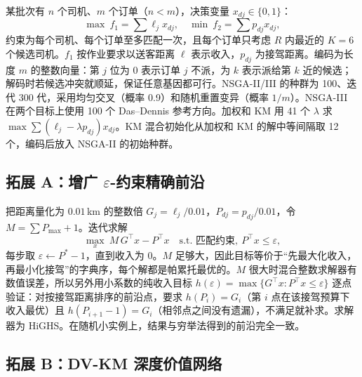 某批次有 $n$ 个司机、$m$ 个订单（$n<m$），决策变量 $x_{dj}\in\{0,1\}$：
\begin{equation}
\max\ f_1=\sum\ell_j x_{dj},\quad \min\ f_2=\sum p_{dj}x_{dj},
\label{eq:moo}
\end{equation}
约束为每个司机、每个订单至多匹配一次，且每个订单只考虑 $R$ 内最近的 $K=6$ 个候选司机。$f_1$ 按作业要求以送客距离 $\ell$ 表示收入，$p_{dj}$ 为接驾距离。编码为长度 $m$ 的整数向量：第 $j$ 位为 0 表示订单 $j$ 不派，为 $k$ 表示派给第 $k$ 近的候选；解码时若候选冲突就顺延，保证任意基因都可行。NSGA-II/III 的种群为 100、迭代 300 代，采用均匀交叉（概率 0.9）和随机重置变异（概率 $1/m$）。NSGA-III 在两个目标上使用 100 个 Das–Dennis 参考方向。加权和 KM 用 41 个 $\lambda$ 求 $\max\sum(\ell_j-\lambda p_{dj})x_{dj}$。KM 混合初始化从加权和 KM 的解中等间隔取 12 个，编码后放入 NSGA-II 的初始种群。

\subsection{拓展 A：增广 $\varepsilon$-约束精确前沿}\label{sec:exact}

把距离量化为 $0.01$\,km 的整数倍 $G_j=\ell_j/0.01$，$P_{dj}=p_{dj}/0.01$，令 $M=\sum P_{\max}+1$。迭代求解
\begin{equation}
\max_{x}\ M\,G^{\top}x-P^{\top}x\quad\text{s.t. 匹配约束},\ P^{\top}x\le\varepsilon ,
\end{equation}
每步取 $\varepsilon\leftarrow P^\ast-1$，直到收入为 0。$M$ 足够大，因此目标等价于“先最大化收入，再最小化接驾”的字典序，每个解都是帕累托最优的\cite{mavrotas2009effective}。$M$ 很大时混合整数求解器有数值误差，所以另外用小系数的纯收入目标 $h(\varepsilon)=\max\{G^\top x: P^\top x\le\varepsilon\}$ 逐点验证：对按接驾距离排序的前沿点，要求 $h(P_i)=G_i$（第 $i$ 点在该接驾预算下收入最优）且 $h(P_{i+1}-1)=G_i$（相邻点之间没有遗漏），不满足就补求。求解器为 HiGHS\cite{huangfu2018parallelizing}。在随机小实例上，结果与穷举法得到的前沿完全一致。

\subsection{拓展 B：DV-KM 深度价值网络}\label{sec:dvkm}

